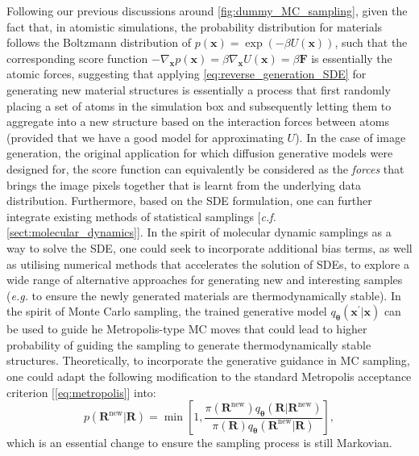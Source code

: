 Following our previous discussions around \cref{fig:dummy_MC_sampling}, given the fact that, in atomistic simulations, the probability distribution for materials follows the Boltzmann distribution of $p(\bm{x})=\exp(-\beta U(\bm{x}))$, such that the corresponding score function $-\nabla_{\bm{x}}p(\bm{x})=\beta\nabla_{\bm{x}}U(\bm{x})=\beta \bm{F}$ is essentially the atomic forces, suggesting that applying \cref{eq:reverse_generation_SDE} for generating new material structures is essentially a process that first randomly placing  a set of atoms in the simulation box and subsequently letting them to aggregate into a new structure based on the interaction forces between atoms (provided that we have a good model for approximating $U$).\cite{cheng2024response} In the case of image generation, the original application for which diffusion generative models were designed for, the score function can equivalently be considered as the \emph{forces} that brings the image pixels together that is learnt from the underlying data distribution. Furthermore, based on the SDE formulation, one can further integrate existing methods of statistical samplings [\emph{c.f.} \cref{sect:molecular_dynamics}]. In the spirit of molecular dynamic samplings as a way to solve the SDE, one could seek to  incorporate additional bias terms, as well as utilising numerical methods that accelerates the solution of SDEs, to explore a wide range of alternative approaches for generating new and interesting samples (\emph{e.g.} to ensure the newly generated materials are thermodynamically stable). In the spirit of Monte Carlo sampling, the trained generative model $q_{\boldsymbol{\theta}}(\bm{x}^\prime|\bm{x})$ can be used to guide he Metropolis-type MC moves that could lead to higher probability of guiding the sampling to generate thermodynamically stable structures. Theoretically, to incorporate the generative guidance in MC sampling, one could adapt the following modification to the standard Metropolis acceptance criterion [\cref{eq:metropolis}] into:
\begin{equation}
    \label{eq:diffusion_metropolis}
    p(\bm{R}^{\mathrm{new}}|\bm{R})=\min\left[1,\frac{\pi(\bm{R}^{\mathrm{new}})q_{\boldsymbol{\theta}}(\bm{R}|\bm{R}^{\mathrm{new}}) }{\pi(\bm{R})q_{\boldsymbol{\theta}}(\bm{R}^{\mathrm{new}}|\bm{R}) } \right],
\end{equation}
which is an essential change to ensure the sampling process is still Markovian. 


